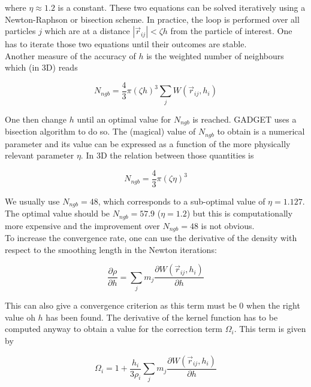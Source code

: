 \documentclass[a4paper,10pt]{report}
\begin{document}
where $\eta \approx 1.2$ is a constant. These two equations can be solved iteratively using a Newton-Raphson or
bisection scheme. In practice, the loop is performed over all particles $j$ which are at a distance
$|\vec{r}_{ij}|<\zeta
h$ from the particle of interest. One has to iterate those two equations until their outcomes are stable.\\
Another measure of the accuracy of $h$ is the weighted number of neighbours which (in 3D) reads

\begin{equation}
 N_{ngb} = \frac{4}{3}\pi \left(\zeta h\right)^3 \sum_j W(\vec{r}_{ij},h_i)
\end{equation}

One then change $h$ until an optimal value for $N_{ngb}$ is reached. GADGET uses a bisection algorithm to do so.
The (magical) value of $N_{ngb}$ to obtain is a numerical parameter and its value can be expressed as a function of the
more physically relevant parameter $\eta$. In 3D the relation between those quantities is

\begin{equation}
 N_{ngb} = \frac{4}{3}\pi\left(\zeta \eta\right)^3
\end{equation}

We usually use $N_{ngb} = 48$, which corresponds to a sub-optimal value of $\eta=1.127$. The optimal value should be
$N_{ngb}=57.9$ ($\eta=1.2$) but this is computationally more expensive and the improvement over $N_{ngb}=48$ is not
obvious.\\ 

To increase the convergence rate, one can use the derivative of the density with respect to the smoothing length in the
Newton iterations:

\begin{equation}
 \frac{\partial \rho}{\partial h} = \sum_j m_j \frac{\partial W(\vec{r}_{ij},h_i)}{\partial h}
\end{equation}

This can also give a convergence criterion as this term must be $0$ when the right value oh $h$ has been found.
The derivative of the kernel function has to be computed anyway to obtain a value for the correction term $\Omega_i$.
This term is given by

\begin{equation}
  \Omega_i = 1 + \frac{h_i}{3\rho_i}\sum_j m_j\frac{\partial W(\vec{r}_{ij},h_i)}{\partial h}
\end{equation}
\end{document}
